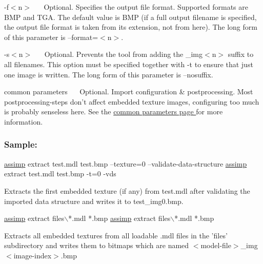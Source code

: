 {\ttfamily -\/f$<$n$>$~\newline
 }~\newline
 Optional. Specifies the output file format. Supported formats are B\+M\+P and T\+G\+A. The default value is B\+M\+P (if a full output filename is specified, the output file format is taken from its extension, not from here). The long form of this parameter is {\ttfamily --format=$<$n$>$}. 

{\ttfamily -\/s$<$n$>$~\newline
 }~\newline
 Optional. Prevents the tool from adding the {\ttfamily \+\_\+img$<$n$>$} suffix to all filenames. This option must be specified together with -\/t to ensure that just one image is written. The long form of this parameter is {\ttfamily --nosuffix}. 

{\ttfamily  common parameters~\newline
}~\newline
 Optional. Import configuration \& postprocessing. Most postprocessing-\/steps don't affect embedded texture images, configuring too much is probably senseless here. See the \hyperlink{common}{common parameters page } for more information. 





\subsubsection*{Sample\+:}


\begin{DoxyCode}
\hyperlink{namespaceassimp}{assimp} extract test.mdl test.bmp --texture=0 --validate-data-structure
\hyperlink{namespaceassimp}{assimp} extract test.mdl test.bmp -t=0 -vds
\end{DoxyCode}


Extracts the first embedded texture (if any) from test.\+mdl after validating the imported data structure and writes it to {\ttfamily test\+\_\+img0.\+bmp}.


\begin{DoxyCode}
\hyperlink{namespaceassimp}{assimp} extract files\(\backslash\)*.mdl *.bmp 
\hyperlink{namespaceassimp}{assimp} extract files\(\backslash\)*.mdl *.bmp 
\end{DoxyCode}


Extracts all embedded textures from all loadable .mdl files in the 'files' subdirectory and writes them to bitmaps which are named {\ttfamily $<$model-\/file$>$\+\_\+img$<$image-\/index$>$.bmp} 